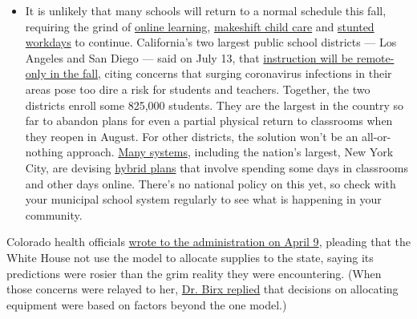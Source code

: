 \begin{itemize}
  \begin{itemize}
  \tightlist
  \item
    It is unlikely that many schools will return to a normal schedule
    this fall, requiring the grind of
    \href{https://www.nytimes3xbfgragh.onion/2020/06/05/us/coronavirus-education-lost-learning.html?action=click\&pgtype=Article\&state=default\&region=MAIN_CONTENT_3\&context=storylines_faq}{online
    learning},
    \href{https://www.nytimes3xbfgragh.onion/2020/05/29/us/coronavirus-child-care-centers.html?action=click\&pgtype=Article\&state=default\&region=MAIN_CONTENT_3\&context=storylines_faq}{makeshift
    child care} and
    \href{https://www.nytimes3xbfgragh.onion/2020/06/03/business/economy/coronavirus-working-women.html?action=click\&pgtype=Article\&state=default\&region=MAIN_CONTENT_3\&context=storylines_faq}{stunted
    workdays} to continue. California's two largest public school
    districts --- Los Angeles and San Diego --- said on July 13, that
    \href{https://www.nytimes3xbfgragh.onion/2020/07/13/us/lausd-san-diego-school-reopening.html?action=click\&pgtype=Article\&state=default\&region=MAIN_CONTENT_3\&context=storylines_faq}{instruction
    will be remote-only in the fall}, citing concerns that surging
    coronavirus infections in their areas pose too dire a risk for
    students and teachers. Together, the two districts enroll some
    825,000 students. They are the largest in the country so far to
    abandon plans for even a partial physical return to classrooms when
    they reopen in August. For other districts, the solution won't be an
    all-or-nothing approach.
    \href{https://bioethics.jhu.edu/research-and-outreach/projects/eschool-initiative/school-policy-tracker/}{Many
    systems}, including the nation's largest, New York City, are
    devising
    \href{https://www.nytimes3xbfgragh.onion/2020/06/26/us/coronavirus-schools-reopen-fall.html?action=click\&pgtype=Article\&state=default\&region=MAIN_CONTENT_3\&context=storylines_faq}{hybrid
    plans} that involve spending some days in classrooms and other days
    online. There's no national policy on this yet, so check with your
    municipal school system regularly to see what is happening in your
    community.
  \end{itemize}
\end{itemize}

Colorado health officials
\href{https://documentingcovid19.io/uploads/DHS\%20HHS\%20ventilator\%20usage\%20by\%20state\%20April\%2012.pdf}{wrote
to the administration on April 9}, pleading that the White House not use
the model to allocate supplies to the state, saying its predictions were
rosier than the grim reality they were encountering. (When those
concerns were relayed to her,
\href{https://www.documentcloud.org/documents/6994649-2020-04-13-Colorado-Re-Birx-IHME-Colorado-FOIA.html}{Dr.
Birx replied} that decisions on allocating equipment were based on
factors beyond the one model.)

